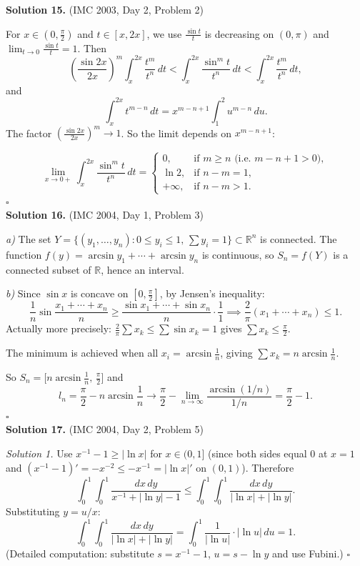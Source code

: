 \documentclass{article}
\begin{document}
\textbf{Solution 15.} (IMC 2003, Day 2, Problem 2)

For \( x \in (0, \frac{\pi}{2}) \) and \( t \in [x, 2x] \), we use \( \frac{\sin t}{t} \) is decreasing on \( (0, \pi) \) and \( \lim_{t \to 0} \frac{\sin t}{t} = 1 \). Then
\[
\left(\frac{\sin 2x}{2x}\right)^m \int_x^{2x} \frac{t^m}{t^n}\,dt < \int_x^{2x} \frac{\sin^m t}{t^n}\,dt < \int_x^{2x} \frac{t^m}{t^n}\,dt,
\]
and
\[
\int_x^{2x} t^{m-n}\,dt = x^{m-n+1}\int_1^2 u^{m-n}\,du.
\]
The factor \( \left(\frac{\sin 2x}{2x}\right)^m \to 1 \). So the limit depends on \( x^{m-n+1} \):

\[
\lim_{x \to 0+} \int_x^{2x} \frac{\sin^m t}{t^n}\,dt =
\begin{cases}
0, & \text{if } m \geq n \text{ (i.e.\ } m - n + 1 > 0\text{)}, \\
\ln 2, & \text{if } n - m = 1, \\
+\infty, & \text{if } n - m > 1.
\end{cases}
\]
\hfill\(\square\)
\\

\textbf{Solution 16.} (IMC 2004, Day 1, Problem 3)

\textit{a)} The set \( Y = \{(y_1,\ldots,y_n) : 0 \leq y_i \leq 1,\, \sum y_i = 1\} \subset \mathbb{R}^n \) is connected. The function \( f(y) = \arcsin y_1 + \cdots + \arcsin y_n \) is continuous, so \( S_n = f(Y) \) is a connected subset of \( \mathbb{R} \), hence an interval.

\textit{b)} Since \( \sin x \) is concave on \( [0, \frac{\pi}{2}] \), by Jensen's inequality:
\[
\frac{1}{n}\sin\frac{x_1+\cdots+x_n}{n} \geq \frac{\sin x_1 + \cdots + \sin x_n}{n} \cdot \frac{1}{1} \implies \frac{2}{\pi}(x_1+\cdots+x_n) \leq 1.
\]
Actually more precisely: \( \frac{2}{\pi}\sum x_k \leq \sum \sin x_k = 1 \) gives \( \sum x_k \leq \frac{\pi}{2} \).

The minimum is achieved when all \( x_i = \arcsin\frac{1}{n} \), giving \( \sum x_k = n\arcsin\frac{1}{n} \).

So \( S_n = \bigl[n\arcsin\frac{1}{n},\, \frac{\pi}{2}\bigr] \) and
\[
l_n = \frac{\pi}{2} - n\arcsin\frac{1}{n} \to \frac{\pi}{2} - \lim_{n\to\infty} \frac{\arcsin(1/n)}{1/n} = \frac{\pi}{2} - 1.
\]
\hfill\(\square\)
\\

\textbf{Solution 17.} (IMC 2004, Day 2, Problem 5)

\textit{Solution 1.} Use \( x^{-1} - 1 \geq |\ln x| \) for \( x \in (0, 1] \) (since both sides equal 0 at \( x=1 \) and \( (x^{-1}-1)' = -x^{-2} \leq -x^{-1} = |\ln x|' \) on \( (0,1) \)). Therefore
\[
\int_0^1\int_0^1 \frac{dx\,dy}{x^{-1}+|\ln y|-1} \leq \int_0^1\int_0^1 \frac{dx\,dy}{|\ln x|+|\ln y|}.
\]
Substituting \( y = u/x \):
\[
\int_0^1\int_0^1 \frac{dx\,dy}{|\ln x|+|\ln y|} = \int_0^1 \frac{1}{|\ln u|} \cdot |\ln u|\,du = 1.
\]
(Detailed computation: substitute \( s = x^{-1} - 1 \), \( u = s - \ln y \) and use Fubini.) \hfill\(\square\)
\end{document}
